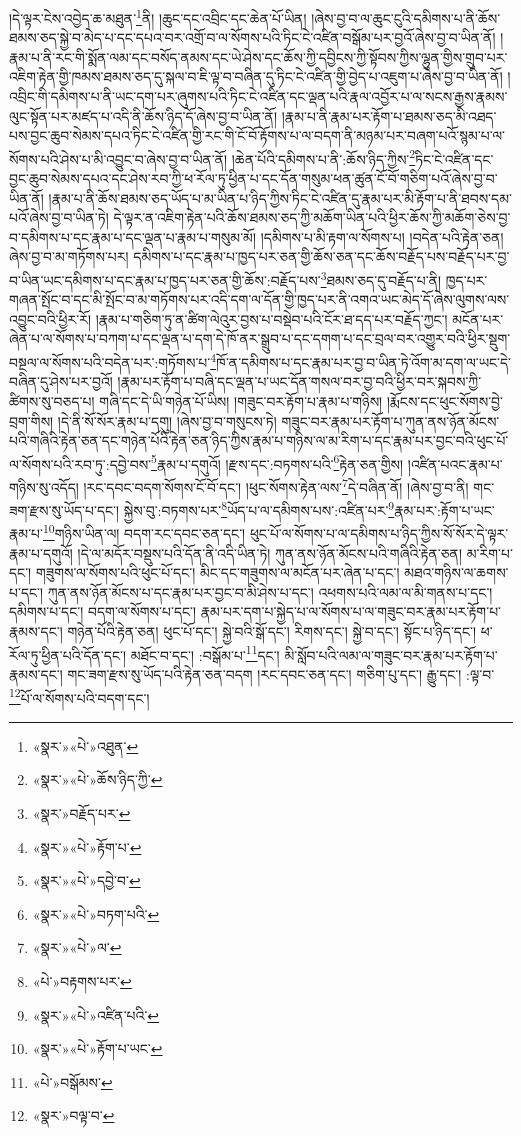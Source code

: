།དེ་ལྟར་ངེས་འབྱེད་ཆ་མཐུན་\footnote{«སྣར་»«པེ་»འཐུན་}ནི། །ཆུང་དང་འབྲིང་དང་ཆེན་པོ་ཡིན། །ཞེས་བྱ་བ་ལ་ཆུང་ངུའི་དམིགས་པ་ནི་ཆོས་ཐམས་ཅད་སྐྱེ་བ་མེད་པ་དང་དཔའ་བར་འགྲོ་བ་ལ་སོགས་པའི་ཏིང་ངེ་འཛིན་བསྒོམ་པར་བྱའོ་ཞེས་བྱ་བ་ཡིན་ནོ། །
རྣམ་པ་ནི་རང་གི་སྨོན་ལམ་དང་བསོད་ནམས་དང་ཡེ་ཤེས་དང་ཆོས་ཀྱི་དབྱིངས་ཀྱི་སྟོབས་ཀྱིས་ལྷུན་གྱིས་གྲུབ་པར་འཇིག་རྟེན་གྱི་ཁམས་ཐམས་ཅད་དུ་སྐལ་བ་ཇི་ལྟ་བ་བཞིན་དུ་ཏིང་ངེ་འཛིན་གྱི་བྱེད་པ་འཇུག་པ་ཞེས་བྱ་བ་ཡིན་ནོ། །འབྲིང་གི་དམིགས་པ་ནི་ཡང་དག་པར་ཞུགས་པའི་ཏིང་ངེ་འཛིན་དང་ལྡན་པའི་རྣལ་འབྱོར་པ་ལ་སངས་རྒྱས་རྣམས་ལུང་སྟོན་པར་མཛད་པ་འདི་ནི་ཆོས་ཉིད་དོ་ཞེས་བྱ་བ་ཡིན་ནོ། །རྣམ་པ་ནི་རྣམ་པར་རྟོག་པ་ཐམས་ཅད་མི་འཐད་པས་བྱང་ཆུབ་སེམས་དཔའ་ཏིང་ངེ་འཛིན་གྱི་རང་གི་ངོ་བོ་རྟོགས་པ་ལ་བདག་ནི་མཉམ་པར་བཞག་པའོ་སྙམ་པ་ལ་སོགས་པའི་ཤེས་པ་མི་འབྱུང་བ་ཞེས་བྱ་བ་ཡིན་ནོ། །ཆེན་པོའི་དམིགས་པ་ནི་:ཆོས་ཉིད་ཀྱིས་\footnote{«སྣར་»«པེ་»ཆོས་ཉིད་ཀྱི་}ཏིང་ངེ་འཛིན་དང་བྱང་ཆུབ་སེམས་དཔའ་དང་ཤེས་རབ་ཀྱི་ཕ་རོལ་ཏུ་ཕྱིན་པ་དང་དོན་གསུམ་ཕན་ཚུན་ངོ་བོ་གཅིག་པའོ་ཞེས་བྱ་བ་ཡིན་ནོ། །རྣམ་པ་ནི་ཆོས་ཐམས་ཅད་ཡོད་པ་མ་ཡིན་པ་ཉིད་ཀྱིས་ཏིང་ངེ་འཛིན་དུ་རྣམ་པར་མི་རྟོག་པ་ནི་ཐབས་དམ་པའོ་ཞེས་བྱ་བ་ཡིན་ཏེ། དེ་ལྟར་ན་འཇིག་རྟེན་པའི་ཆོས་ཐམས་ཅད་ཀྱི་མཆོག་ཡིན་པའི་ཕྱིར་ཆོས་ཀྱི་མཆོག་ཅེས་བྱ་བ་དམིགས་པ་དང་རྣམ་པ་དང་ལྡན་པ་རྣམ་པ་གསུམ་མོ། །དམིགས་པ་མི་རྟག་ལ་སོགས་པ། །བདེན་པའི་རྟེན་ཅན། ཞེས་བྱ་བ་མ་གཏོགས་པར། དམིགས་པ་དང་རྣམ་པ་ཁྱད་པར་ཅན་གྱི་ཆོས་ཅན་དང་ཆོས་བརྗོད་པས་བརྗོད་པར་བྱ་བ་ཡིན་ཡང་དམིགས་པ་དང་རྣམ་པ་ཁྱད་པར་ཅན་གྱི་ཆོས་:བརྗོད་པས་\footnote{«སྣར་»བརྗོད་པར་}ཐམས་ཅད་དུ་བརྗོད་པ་ནི། ཁྱད་པར་གཞན་སྤོང་བ་དང་མི་སྤོང་བ་མ་གཏོགས་པར་འདི་དག་ལ་དོན་གྱི་ཁྱད་པར་ནི་འགའ་ཡང་མེད་དོ་ཞེས་ལུགས་ལས་འབྱུང་བའི་ཕྱིར་རོ། །རྣམ་པ་གཅིག་ཏུ་ན་ཚིག་ལེའུར་བྱས་པ་བསྡེབ་པའི་ངོར་ཐ་དད་པར་བརྗོད་ཀྱང་། མངོན་པར་ཞེན་པ་ལ་སོགས་པ་བཀག་པ་དང་ལྡན་པ་དག་དེ་ཁོ་ནར་སྒྲུབ་པ་དང་དགག་པ་དང་བྲལ་བར་འགྱུར་བའི་ཕྱིར་སྡུག་བསྔལ་ལ་སོགས་པའི་བདེན་པར་:གཏོགས་པ་\footnote{«སྣར་»«པེ་»རྟོག་པ་}ཁོ་ན་དམིགས་པ་དང་རྣམ་པར་བྱ་བ་ཡིན་ཏེ་འོག་མ་དག་ལ་ཡང་དེ་བཞིན་དུ་ཤེས་པར་བྱའོ། །རྣམ་པར་རྟོག་པ་བཞི་དང་ལྡན་པ་ཡང་དོན་གསལ་བར་བྱ་བའི་ཕྱིར་བར་སྐབས་ཀྱི་ཚིགས་སུ་བཅད་པ། གཞི་དང་དེ་ཡི་གཉེན་པོ་ཡིས། །གཟུང་བར་རྟོག་པ་རྣམ་པ་གཉིས། །རྨོངས་དང་ཕུང་སོགས་བྱེ་བྲག་གིས། །དེ་ནི་སོ་སོར་རྣམ་པ་དགུ། །ཞེས་བྱ་བ་གསུངས་ཏེ། གཟུང་བར་རྣམ་པར་རྟོག་པ་ཀུན་ནས་ཉོན་མོངས་པའི་གཞིའི་རྟེན་ཅན་དང་གཉེན་པོའི་རྟེན་ཅན་ཉིད་ཀྱིས་རྣམ་པ་གཉིས་ལ་མ་རིག་པ་དང་རྣམ་པར་བྱང་བའི་ཕུང་པོ་ལ་སོགས་པའི་རབ་ཏུ་:དབྱེ་བས་\footnote{«སྣར་»«པེ་»དབྱེ་བ་}རྣམ་པ་དགུའོ། །རྫས་དང་:བཏགས་པའི་\footnote{«སྣར་»«པེ་»བཏག་པའི་}རྟེན་ཅན་གྱིས། །འཛིན་པའང་རྣམ་པ་གཉིས་སུ་འདོད། །རང་དབང་བདག་སོགས་ངོ་བོ་དང་། །ཕུང་སོགས་རྟེན་ལས་\footnote{«སྣར་»«པེ་»ལ་}དེ་བཞིན་ནོ། །ཞེས་བྱ་བ་ནི། གང་ཟག་རྫས་སུ་ཡོད་པ་དང་། སྐྱེས་བུ་:བཏགས་པར་\footnote{«པེ་»བརྟགས་པར་}ཡོད་པ་ལ་དམིགས་པས་:འཛིན་པར་\footnote{«སྣར་»«པེ་»འཛིན་པའི་}རྣམ་པར་:རྟོག་པ་ཡང་རྣམ་པ་\footnote{«སྣར་»«པེ་»རྟོག་པ་ཡང་}གཉིས་ཡིན་ལ། བདག་རང་དབང་ཅན་དང་། ཕུང་པོ་ལ་སོགས་པ་ལ་དམིགས་པ་ཉིད་ཀྱིས་སོ་སོར་དེ་ལྟར་རྣམ་པ་དགུའོ། །དེ་ལ་མདོར་བསྡུས་པའི་དོན་ནི་འདི་ཡིན་ཏེ། ཀུན་ནས་ཉོན་མོངས་པའི་གཞིའི་རྟེན་ཅན། མ་རིག་པ་དང་། གཟུགས་ལ་སོགས་པའི་ཕུང་པོ་དང་། མིང་དང་གཟུགས་ལ་མངོན་པར་ཞེན་པ་དང་། མཐའ་གཉིས་ལ་ཆགས་པ་དང་། ཀུན་ནས་ཉོན་མོངས་པ་དང་རྣམ་པར་བྱང་བ་མི་ཤེས་པ་དང་། འཕགས་པའི་ལམ་ལ་མི་གནས་པ་དང་། དམིགས་པ་དང་། བདག་ལ་སོགས་པ་དང་། རྣམ་པར་དག་པ་སྐྱེད་པ་ལ་སོགས་པ་ལ་གཟུང་བར་རྣམ་པར་རྟོག་པ་རྣམས་དང་། གཉེན་པོའི་རྟེན་ཅན། ཕུང་པོ་དང་། སྐྱེ་བའི་སྒོ་དང་། རིགས་དང་། སྐྱེ་བ་དང་། སྟོང་པ་ཉིད་དང་། ཕ་རོལ་ཏུ་ཕྱིན་པའི་དོན་དང་། མཐོང་བ་དང་། :བསྒོམ་པ་\footnote{«པེ་»བསྒོམས་}དང་། མི་སློབ་པའི་ལམ་ལ་གཟུང་བར་རྣམ་པར་རྟོག་པ་རྣམས་དང་། གང་ཟག་རྫས་སུ་ཡོད་པའི་རྟེན་ཅན་བདག །རང་དབང་ཅན་དང་། གཅིག་པུ་དང་། རྒྱུ་དང་། :ལྟ་བ་\footnote{«སྣར་»བལྟ་བ་}པོ་ལ་སོགས་པའི་བདག་དང་། 